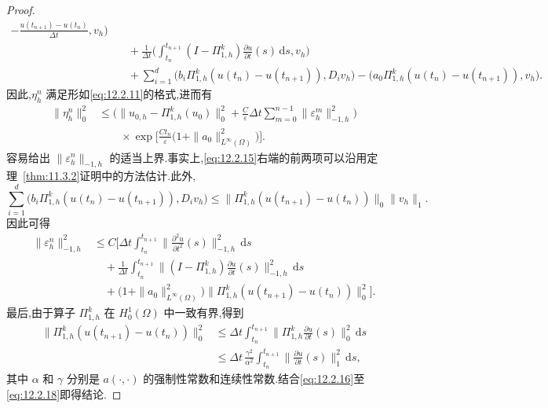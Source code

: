 \begin{proof}
\begin{equation}
\begin{aligned}
         -\frac{u(t_{n+1})-u(t_n)}{\Delta t},v_h\biggr)\\
      &\quad+\frac1{\Delta t}\biggl(\int_{t_n}^{t_{n+1}}
          (I-\Pi_{1,h}^k)\frac{\partial u}{\partial t}(s)\,\mathrm ds,v_h\biggr)\\
      &\quad+\sum_{i=1}^d\bigl(b_i\Pi_{1,h}^k(u(t_n)-u(t_{n+1})),D_iv_h\bigr)
       -\bigl(a_0\Pi_{1,h}^k(u(t_n)-u(t_{n+1})),v_h\bigr).
  \end{aligned}
\end{equation}
因此,\(\eta_h^n\) 满足形如\eqref{eq:12.2.11}的格式,进而有
\begin{equation}\label{eq:12.2.16}
  \begin{aligned}
    \|\eta_h^n\|_0^2
      &\le\biggl(\|u_{0,h}-\Pi_{1,h}^k(u_0)\|_0^2
          +\frac C\varepsilon\Delta t\sum_{m=0}^{n-1}
             \|\varepsilon_h^m\|_{-1,h}^2\biggr)\\
      &\qquad\times\exp\biggl[\frac{Ct_n}{\varepsilon}
                 \bigl(1+\|a_0\|_{L^\infty(\Omega)}^2\bigr)\biggr].
  \end{aligned}
\end{equation}
容易给出 \(\|\varepsilon_h^n\|_{-1,h}\) 的适当上界.事实上,\eqref{eq:12.2.15}右端的前两项可以沿用定理~\ref{thm:11.3.2}证明中的方法估计.此外,
\[
  \sum_{i=1}^d\bigl(b_i\Pi_{1,h}^k(u(t_n)-u(t_{n+1})),D_iv_h\bigr)
    \le\|\Pi_{1,h}^k(u(t_{n+1})-u(t_n))\|_0\|v_h\|_1.
\]
因此可得
\begin{equation}\label{eq:12.2.17}
  \begin{aligned}
    \|\varepsilon_h^n\|_{-1,h}^2
      &\le C\biggl[\Delta t\int_{t_n}^{t_{n+1}}
           \biggl\|\frac{\partial^2u}{\partial t^2}(s)\biggr\|_{-1,h}^2\,\mathrm ds\\
      &\quad+\frac1{\Delta t}\int_{t_n}^{t_{n+1}}
          \biggl\|(I-\Pi_{1,h}^k)\frac{\partial u}{\partial t}(s)\biggr\|_{-1,h}^2\,\mathrm ds\\
      &\quad+\bigl(1+\|a_0\|_{L^\infty(\Omega)}^2\bigr)
             \|\Pi_{1,h}^k(u(t_{n+1})-u(t_n))\|_0^2\biggr].
  \end{aligned}
\end{equation}
最后,由于算子 \(\Pi_{1,h}^k\) 在 \(H_0^1(\Omega)\) 中一致有界,得到
\begin{equation}\label{eq:12.2.18}
  \begin{aligned}
    \|\Pi_{1,h}^k(u(t_{n+1})-u(t_n))\|_0^2
      &\le\Delta t\int_{t_n}^{t_{n+1}}
        \biggl\|\Pi_{1,h}^k\frac{\partial u}{\partial t}(s)\biggr\|_0^2\,\mathrm ds\\
      &\le\Delta t\,\frac{\gamma^2}{\alpha^2}\int_{t_n}^{t_{n+1}}
        \biggl\|\frac{\partial u}{\partial t}(s)\biggr\|_1^2\,\mathrm ds,
  \end{aligned}
\end{equation}
其中 \(\alpha\) 和 \(\gamma\) 分别是 \(a(\cdot,\cdot)\) 的强制性常数和连续性常数.结合\eqref{eq:12.2.16}至\eqref{eq:12.2.18}即得结论.
\end{proof}

